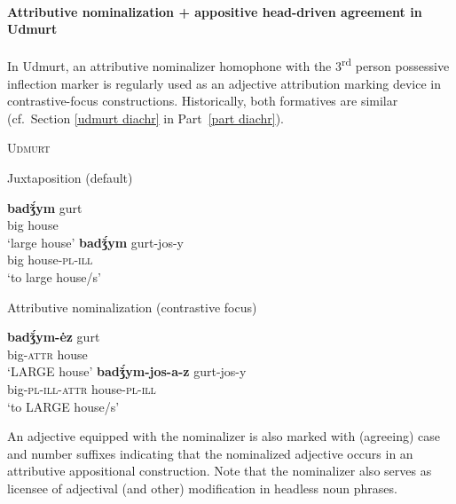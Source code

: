\paragraph{Attributive nominalization + appositive head-driven agreement in Udmurt} \label{udmurt synchr}
In Udmurt, an attributive nominalizer homophone with the 3\textsuperscript{rd} person possessive inflection marker is regularly used as an adjective attribution marking device in contrastive-focus constructions. Historically, both formatives are similar (cf.~Section \ref{udmurt diachr} in Part~\ref{part diachr}).
\begin{exe}
\ex \textsc{Udmurt} \citep{winkler2001}
\begin{xlist}
\ex	Juxtaposition (default)
\begin{xlist}
\ex
\gll	\textbf{badǯ́ym} gurt\\
	big house\\
\glt	‘large house’
\ex	
\gll	\textbf{badǯ́ym} gurt-jos-y\\
	big house-\textsc{pl}-\textsc{ill}\\
\glt	‘to large house/s’
\end{xlist}
\ex	Attributive nominalization (contrastive focus)
\begin{xlist}
\ex
\gll	\textbf{badǯ́ym-ėz} gurt\\
	big-\textsc{attr} house\\
\glt	‘LARGE house’
\ex	
\gll	\textbf{badǯ́ym-jos-a-z} gurt-jos-y\\
	big-\textsc{pl}-\textsc{ill}-\textsc{attr} house-\textsc{pl}-\textsc{ill}\\
\glt	‘to LARGE house/s’
\end{xlist}
\end{xlist}
\end{exe}
An adjective equipped with the nominalizer is also marked with (agreeing) case and number suffixes indicating that the nominalized adjective occurs in an attributive appositional construction. Note that the nominalizer also serves as licensee of adjectival (and other) modification in headless noun phrases.
